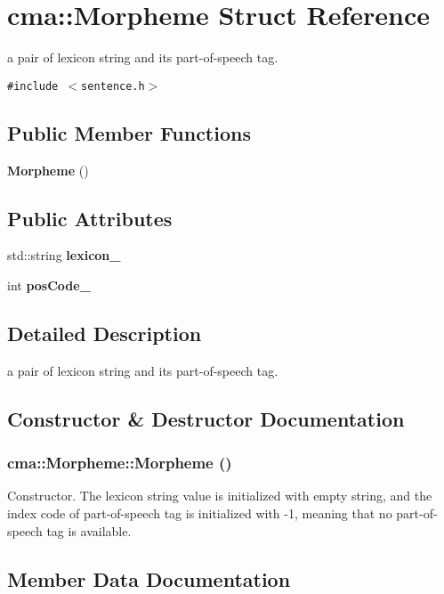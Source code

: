 \section{cma::Morpheme Struct Reference}
\label{structcma_1_1Morpheme}
a pair of lexicon string and its part-of-speech tag.  


{\tt \#include $<$sentence.h$>$}

\subsection*{Public Member Functions}
\begin{CompactItemize}
\item 
{\bf Morpheme} ()
\end{CompactItemize}
\subsection*{Public Attributes}
\begin{CompactItemize}
\item 
std::string {\bf lexicon\_\-}
\item 
int {\bf posCode\_\-}
\end{CompactItemize}


\subsection{Detailed Description}
a pair of lexicon string and its part-of-speech tag. 

\subsection{Constructor \& Destructor Documentation}
\subsubsection[{Morpheme}]{\setlength{\rightskip}{0pt plus 5cm}cma::Morpheme::Morpheme ()}\label{structcma_1_1Morpheme_79ab5404cd959f89daadb8a7714334cb}


Constructor. The lexicon string value is initialized with empty string, and the index code of part-of-speech tag is initialized with -1, meaning that no part-of-speech tag is available. 

\subsection{Member Data Documentation}
